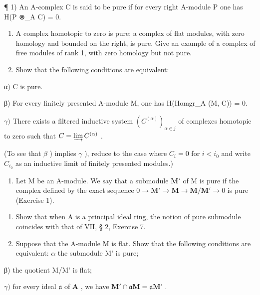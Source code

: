 
¶ 1) An A-complex C is said to be pure if for every right A-module P one has H(P ⊗\_A C) = 0.

\begin{enumerate}
\def\labelenumi{\alph{enumi})}
\item
  A complex homotopic to zero is pure; a complex of flat modules, with zero homology and bounded on the right, is pure. Give an example of a complex of free modules of rank 1, with zero homology but not pure.
\item
  Show that the following conditions are equivalent:
\end{enumerate}

α) C is pure.

β) For every finitely presented A-module M, one has H(Homgr\_A (M, C)) = 0.

\(\gamma)\) There exists a filtered inductive system \((C^{(\alpha)})_{\alpha \in j}\) of complexes homotopic to zero such that \(C = \varinjlim C^{(\alpha)}\) .

(To see that \(\beta\) ) implies \(\gamma\) ), reduce to the case where \(C_i = 0\) for \(i < i_0\) and write \(C_{i_0}\) as an inductive limit of finitely presented modules.)

\begin{enumerate}
\def\labelenumi{\arabic{enumi})}
\setcounter{enumi}{1}
\tightlist
\item
  Let M be an A-module. We say that a submodule \(\mathbf{M}'\) of M is pure if the complex defined by the exact sequence \(0 \to \mathbf{M}' \to \mathbf{M} \to \mathbf{M} / \mathbf{M}' \to 0\) is pure (Exercise 1).
\end{enumerate}

\begin{enumerate}
\def\labelenumi{\alph{enumi})}
\item
  Show that when A is a principal ideal ring, the notion of pure submodule coincides with that of VII, § 2, Exercise 7.
\item
  Suppose that the A-module M is flat. Show that the following conditions are equivalent: \(\alpha\) the submodule M' is pure;
\end{enumerate}

β) the quotient M/M' is flat;

\(\gamma)\) for every ideal \(\mathfrak{a}\) of \(\mathbf{A}\) , we have \(\mathbf{M}' \cap \mathfrak{a}\mathbf{M} = \mathfrak{a}\mathbf{M}'\) .

